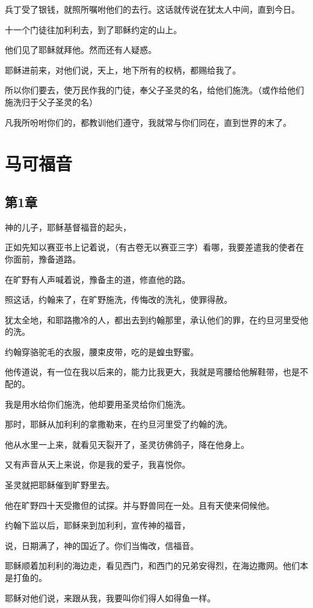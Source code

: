 \documentclass[12pt,oneside]{book}
\begin{document}
兵丁受了银钱，就照所嘱咐他们的去行。这话就传说在犹太人中间，直到今日。

十一个门徒往加利利去，到了耶稣约定的山上。

他们见了耶稣就拜他。然而还有人疑惑。

耶稣进前来，对他们说，天上，地下所有的权柄，都赐给我了。

所以你们要去，使万民作我的门徒，奉父子圣灵的名，给他们施洗。（或作给他们施洗归于父子圣灵的名）

凡我所吩咐你们的，都教训他们遵守，我就常与你们同在，直到世界的末了。


\part{马可福音}
\chapter{第1章}
神的儿子，耶稣基督福音的起头，

正如先知以赛亚书上记着说，（有古卷无以赛亚三字）看哪，我要差遣我的使者在你面前，豫备道路。

在旷野有人声喊着说，豫备主的道，修直他的路。

照这话，约翰来了，在旷野施洗，传悔改的洗礼，使罪得赦。

犹太全地，和耶路撒冷的人，都出去到约翰那里，承认他们的罪，在约旦河里受他的洗。

约翰穿骆驼毛的衣服，腰束皮带，吃的是蝗虫野蜜。

他传道说，有一位在我以后来的，能力比我更大，我就是弯腰给他解鞋带，也是不配的。

我是用水给你们施洗，他却要用圣灵给你们施洗。

那时，耶稣从加利利的拿撒勒来，在约旦河里受了约翰的洗。

他从水里一上来，就看见天裂开了，圣灵彷佛鸽子，降在他身上。

又有声音从天上来说，你是我的爱子，我喜悦你。

圣灵就把耶稣催到旷野里去。

他在旷野四十天受撒但的试探。并与野兽同在一处。且有天使来伺候他。

约翰下监以后，耶稣来到加利利，宣传神的福音，

说，日期满了，神的国近了。你们当悔改，信福音。

耶稣顺着加利利的海边走，看见西门，和西门的兄弟安得烈，在海边撒网。他们本是打鱼的。

耶稣对他们说，来跟从我，我要叫你们得人如得鱼一样。
\end{document}

